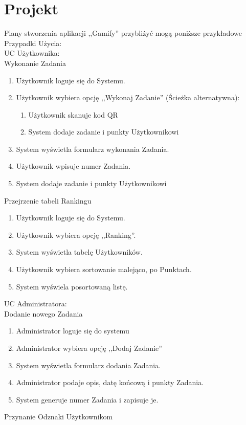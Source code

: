 \documentclass[a4paper,12pt,twoside,openany]{report}
\begin{document}
	\section{Projekt}
	Plany stworzenia aplikacji ,,Gamify'' przybliżyć mogą poniższe przykładowe Przypadki Użycia:\\
	UC Użytkownika:\\
	Wykonanie Zadania
	\begin{enumerate}
		\item Użytkownik loguje się do Systemu.
		\item Użytkownik wybiera opcję ,,Wykonaj Zadanie'' (Ścieżka alternatywna):
		\begin{enumerate}
		\item Użytkownik skanuje kod QR
		\item System dodaje zadanie i punkty Użytkownikowi
		\end{enumerate}
		\item System wyświetla formularz wykonania Zadania.
		\item Użytkownik wpisuje numer Zadania.
		\item System dodaje zadanie i punkty Użytkownikowi
	\end{enumerate}
	Przejrzenie tabeli Rankingu
	\begin{enumerate}
		\item Użytkownik loguje się do Systemu.
		\item Użytkownik wybiera opcję ,,Ranking''.
		\item System wyświetla tabelę Użytkowników.
		\item Użytkownik wybiera sortowanie malejąco, po Punktach.
		\item System wyświela posortowaną listę.
	\end{enumerate}
	UC Administratora:\\
	Dodanie nowego Zadania
	\begin{enumerate}
		\item Administrator loguje się do systemu
		\item Administrator wybiera opcję ,,Dodaj Zadanie''
		\item System wyświetla formularz dodania Zadania.
		\item Administrator podaje opis, datę końcową i punkty Zadania.
		\item System generuje numer Zadania i zapisuje je.
	\end{enumerate}
	Przynanie Odznaki Użytkownikom
\end{document}
